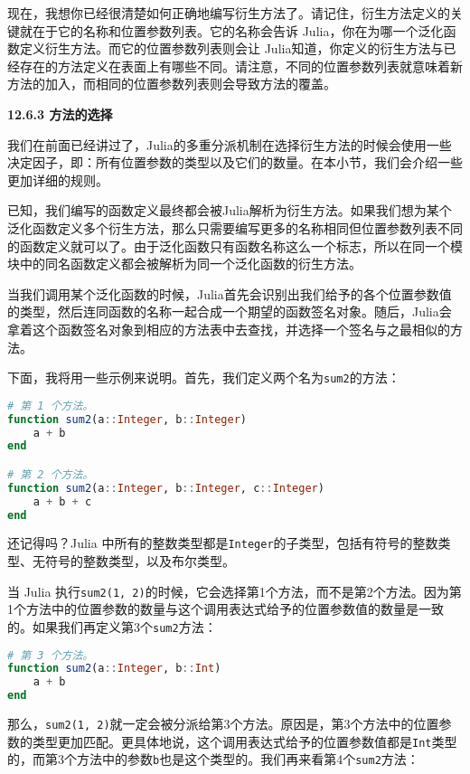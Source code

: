 现在，我想你已经很清楚如何正确地编写衍生方法了。请记住，衍生方法定义的关键就在于它的名称和位置参数列表。它的名称会告诉 Julia，你在为哪一个泛化函数定义衍生方法。而它的位置参数列表则会让 Julia知道，你定义的衍生方法与已经存在的方法定义在表面上有哪些不同。请注意，不同的位置参数列表就意味着新方法的加入，而相同的位置参数列表则会导致方法的覆盖。

\textbf{12.6.3 方法的选择}

我们在前面已经讲过了，Julia的多重分派机制在选择衍生方法的时候会使用一些决定因子，即：所有位置参数的类型以及它们的数量。在本小节，我们会介绍一些更加详细的规则。

已知，我们编写的函数定义最终都会被Julia解析为衍生方法。如果我们想为某个泛化函数定义多个衍生方法，那么只需要编写更多的名称相同但位置参数列表不同的函数定义就可以了。由于泛化函数只有函数名称这么一个标志，所以在同一个模块中的同名函数定义都会被解析为同一个泛化函数的衍生方法。

当我们调用某个泛化函数的时候，Julia首先会识别出我们给予的各个位置参数值的类型，然后连同函数的名称一起合成一个期望的函数签名对象。随后，Julia会拿着这个函数签名对象到相应的方法表中去查找，并选择一个签名与之最相似的方法。

下面，我将用一些示例来说明。首先，我们定义两个名为\verb|sum2|的方法：

\begin{lstlisting}[language=julia]
# 第 1 个方法。
function sum2(a::Integer, b::Integer)
    a + b
end

# 第 2 个方法。
function sum2(a::Integer, b::Integer, c::Integer)
    a + b + c
end
\end{lstlisting}

还记得吗？Julia 中所有的整数类型都是\verb|Integer|的子类型，包括有符号的整数类型、无符号的整数类型，以及布尔类型。

当 Julia 执行\verb|sum2(1, 2)|的时候，它会选择第1个方法，而不是第2个方法。因为第1个方法中的位置参数的数量与这个调用表达式给予的位置参数值的数量是一致的。如果我们再定义第3个\verb|sum2|方法：

\begin{lstlisting}[language=julia]
# 第 3 个方法。
function sum2(a::Integer, b::Int)
    a + b
end
\end{lstlisting}

那么，\verb|sum2(1, 2)|就一定会被分派给第3个方法。原因是，第3个方法中的位置参数的类型更加匹配。更具体地说，这个调用表达式给予的位置参数值都是\verb|Int|类型的，而第3个方法中的参数\verb|b|也是这个类型的。我们再来看第4个\verb|sum2|方法：

